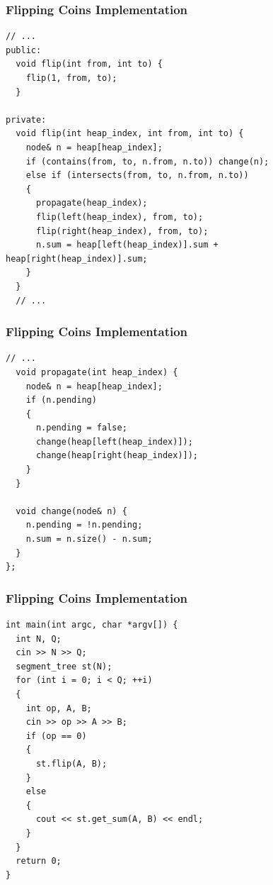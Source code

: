\documentclass{beamer}
\begin{document}
\begin{frame}[containsverbatim]
\frametitle{Flipping Coins Implementation}

\scriptsize

\begin{lstlisting}[mathescape]
  // ...
public:
  void flip(int from, int to) {
    flip(1, from, to);
  }

private:
  void flip(int heap_index, int from, int to) {
    node& n = heap[heap_index];
    if (contains(from, to, n.from, n.to)) change(n);
    else if (intersects(from, to, n.from, n.to))
    {
      propagate(heap_index);
      flip(left(heap_index), from, to);
      flip(right(heap_index), from, to);
      n.sum = heap[left(heap_index)].sum + heap[right(heap_index)].sum;
    }
  }
  // ...
\end{lstlisting}

\end{frame}

\begin{frame}[containsverbatim]
\frametitle{Flipping Coins Implementation}

\scriptsize

\begin{lstlisting}[mathescape]
  // ...
  void propagate(int heap_index) {
    node& n = heap[heap_index];
    if (n.pending)
    {
      n.pending = false;
      change(heap[left(heap_index)]);
      change(heap[right(heap_index)]);
    }
  }

  void change(node& n) {
    n.pending = !n.pending;
    n.sum = n.size() - n.sum;
  }
};
\end{lstlisting}

\end{frame}

\begin{frame}[containsverbatim]
\frametitle{Flipping Coins Implementation}

\scriptsize

\begin{lstlisting}[mathescape]
int main(int argc, char *argv[]) {
  int N, Q;
  cin >> N >> Q;
  segment_tree st(N);
  for (int i = 0; i < Q; ++i)
  {
    int op, A, B;
    cin >> op >> A >> B;
    if (op == 0)
    {
      st.flip(A, B);
    }
    else
    {
      cout << st.get_sum(A, B) << endl;
    }
  }
  return 0;
}
\end{lstlisting}

\end{frame}
\end{document}
